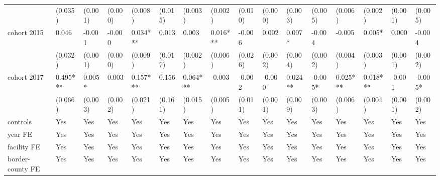 \begin{table}[H]
{\begin{tabular}{@{}llllllllllllllll@{}}
            & (0.035)  & (0.001)         & (0.000)         & (0.008)    & (0.015)               & (0.003)       & (0.002)  & (0.010)   & (0.000)              & (0.003) & (0.005)  & (0.006)         & (0.002) & (0.001) & (0.005)  \\
            cohort 2015                 & 0.046    & -0.001          & -0.000          & 0.034***   & 0.013                 & 0.003         & 0.016*** & -0.006    & 0.002                & 0.007*              & -0.004   & -0.005     & 0.005* & 0.000 & -0.004       \\
            & (0.032)  & (0.001)         & (0.000)         & (0.009)    & (0.017)               & (0.002)       & (0.006)  & (0.026)   & (0.002)              & (0.004)             & (0.002)  & (0.004)          & (0.003) & (0.001)  & (0.002)   \\
            cohort 2017                 & 0.495*** & 0.005*          & 0.003           & 0.157***   & 0.156                 & 0.064***      & -0.003   & -0.002    & -0.000               & 0.024**             & -0.005*  & 0.025***       & 0.018*** & -0.001 & -0.005*     \\
            & (0.066)  & (0.003)         & (0.002)         & (0.021)    & (0.161)               & (0.015)       & (0.005)  & (0.011)   & (0.001)              & (0.009)             & (0.003)  & (0.006)   & (0.004) & (0.001)  & (0.002)       \\
            controls                    & Yes      & Yes             & Yes             & Yes        & Yes                   & Yes           & Yes      & Yes       & Yes                  & Yes                 & Yes      & Yes                   & Yes                       & Yes                         & Yes                         \\
            year FE                     & Yes      & Yes             & Yes             & Yes        & Yes                   & Yes           & Yes      & Yes       & Yes                  & Yes                 & Yes      & Yes                   & Yes                       & Yes                         & Yes                         \\
            facility FE                 & Yes      & Yes             & Yes             & Yes        & Yes                   & Yes           & Yes      & Yes       & Yes                  & Yes                 & Yes      & Yes                   & Yes                       & Yes                         & Yes                         \\
            border-county FE            & Yes      & Yes             & Yes             & Yes        & Yes                   & Yes           & Yes      & Yes       & Yes                  & Yes                 & Yes      & Yes                   & Yes                       & Yes                         & Yes                         \\

\end{tabular}}
\end{table}
